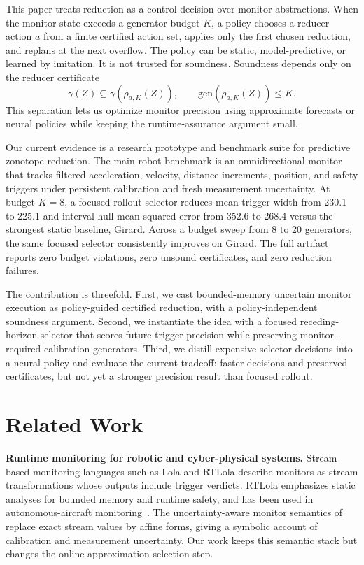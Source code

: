 \documentclass{article}
\newcommand{\gen}{\mathrm{gen}}
\newcommand{\reduce}{\rho}
\newcommand{\concretize}{\gamma}
\begin{document}
This paper treats reduction as a control decision over monitor abstractions.
When the monitor state exceeds a generator budget \(K\), a policy chooses a
reducer action \(a\) from a finite certified action set, applies only the first
chosen reduction, and replans at the next overflow. The policy can be static,
model-predictive, or learned by imitation. It is not trusted for soundness.
Soundness depends only on the reducer certificate
\[
  \concretize(Z) \subseteq \concretize(\reduce_{a,K}(Z)),
  \qquad
  \gen(\reduce_{a,K}(Z)) \le K .
\]
This separation lets us optimize monitor precision using approximate forecasts
or neural policies while keeping the runtime-assurance argument small.

Our current evidence is a research prototype and benchmark suite for predictive
zonotope reduction. The main robot benchmark is an omnidirectional monitor that
tracks filtered acceleration, velocity, distance increments, position, and
safety triggers under persistent calibration and fresh measurement uncertainty.
At budget \(K=8\), a focused rollout selector reduces mean trigger width from
230.1 to 225.1 and interval-hull mean squared error from 352.6 to 268.4 versus
the strongest static baseline, Girard. Across a budget sweep from 8 to 20
generators, the same focused selector consistently improves on Girard. The full
artifact reports zero budget violations, zero unsound certificates, and zero
reduction failures.

The contribution is threefold. First, we cast bounded-memory uncertain monitor
execution as policy-guided certified reduction, with a policy-independent
soundness argument. Second, we instantiate the idea with a focused
receding-horizon selector that scores future trigger precision while preserving
monitor-required calibration generators. Third, we distill expensive selector
decisions into a neural policy and evaluate the current tradeoff: faster
decisions and preserved certificates, but not yet a stronger precision result
than focused rollout.

\section{Related Work}

\textbf{Runtime monitoring for robotic and cyber-physical systems.}
Stream-based monitoring languages such as Lola and RTLola describe monitors as
stream transformations whose outputs include trigger verdicts. RTLola emphasizes
static analyses for bounded memory and runtime safety, and has been used in
autonomous-aircraft monitoring~\citep{baumeister2020cleared,baumeister2026rtlola}.
The uncertainty-aware monitor semantics of \citet{finkbeiner2026cutting}
replace exact stream values by affine forms, giving a symbolic account of
calibration and measurement uncertainty. Our work keeps this semantic stack but
changes the online approximation-selection step.
\end{document}
